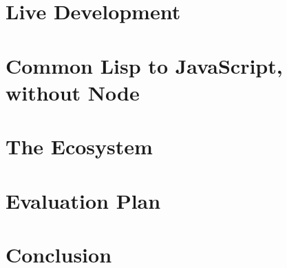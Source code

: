 \documentclass[11pt,a4paper]{article}
\begin{document}
\section{Live Development}
\label{sec:live}

\section{Common Lisp to JavaScript, without Node}
\label{sec:cljs}

\section{The Ecosystem}
\label{sec:ecosystem}

\section{Evaluation Plan}
\label{sec:eval}

\section{Conclusion}
\label{sec:conclusion}



\end{document}
